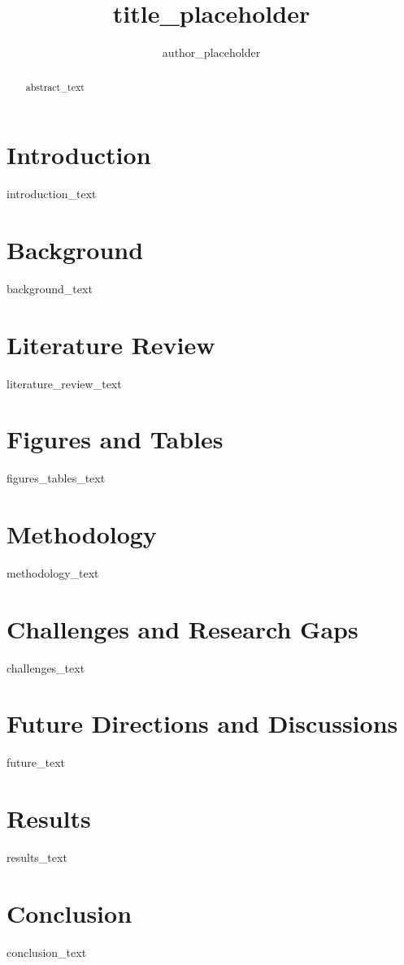 \documentclass[conference]{IEEEtran}
\title{{title_placeholder}}
\author{{author_placeholder}}
\begin{document}
\maketitle

\begin{abstract}
{{abstract_text}}  %
\end{abstract}

\section{Introduction}
{{introduction_text}}

\section{Background}
{{background_text}}

\section{Literature Review}
{{literature_review_text}}

\section{Figures and Tables}
{{figures_tables_text}}

\section{Methodology}
{{methodology_text}}

\section{Challenges and Research Gaps}
{{challenges_text}}

\section{Future Directions and Discussions}
{{future_text}}

\section{Results}
{{results_text}}

\section{Conclusion}
{{conclusion_text}}


\end{document}

